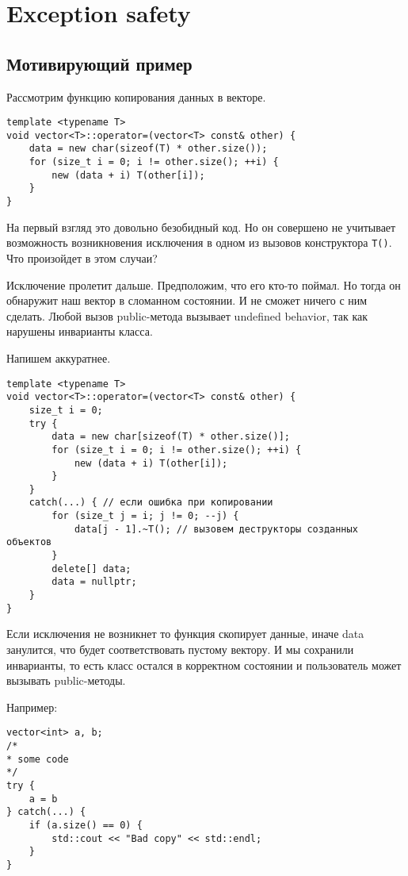 \section{Exception safety}
\subsection{Мотивирующий пример}
Рассмотрим функцию копирования данных в векторе.
\begin{verbatim}
template <typename T>
void vector<T>::operator=(vector<T> const& other) {
    data = new char(sizeof(T) * other.size());
    for (size_t i = 0; i != other.size(); ++i) {
        new (data + i) T(other[i]);
    }
}
\end{verbatim}

На первый взгляд это довольно безобидный код. Но он совершено не учитывает возможность возникновения исключения в одном из вызовов конструктора \texttt{T()}. Что произойдет в этом случаи?

Исключение пролетит дальше. Предположим, что его кто-то поймал. Но тогда он обнаружит наш вектор в сломанном состоянии. И не сможет ничего с ним сделать. Любой вызов public-метода вызывает undefined behavior, так как нарушены инварианты класса.

Напишем аккуратнее.
\begin{verbatim}
template <typename T>
void vector<T>::operator=(vector<T> const& other) {
    size_t i = 0;
    try {
        data = new char[sizeof(T) * other.size()];
        for (size_t i = 0; i != other.size(); ++i) {
            new (data + i) T(other[i]);
        }
    }
    catch(...) { // если ошибка при копировании
        for (size_t j = i; j != 0; --j) {
            data[j - 1].~T(); // вызовем деструкторы созданных объектов
        }
        delete[] data;
        data = nullptr;
    }
}
\end{verbatim}

Если исключения не возникнет то функция скопирует данные, иначе data занулится, что будет соответствовать пустому вектору. И мы сохранили инварианты, то есть класс остался в корректном состоянии и пользователь может вызывать public-методы.

Например:
\begin{verbatim}
vector<int> a, b;
/*
* some code
*/
try {
    a = b
} catch(...) {
    if (a.size() == 0) {
        std::cout << "Bad copy" << std::endl;
    }
}
\end{verbatim}

